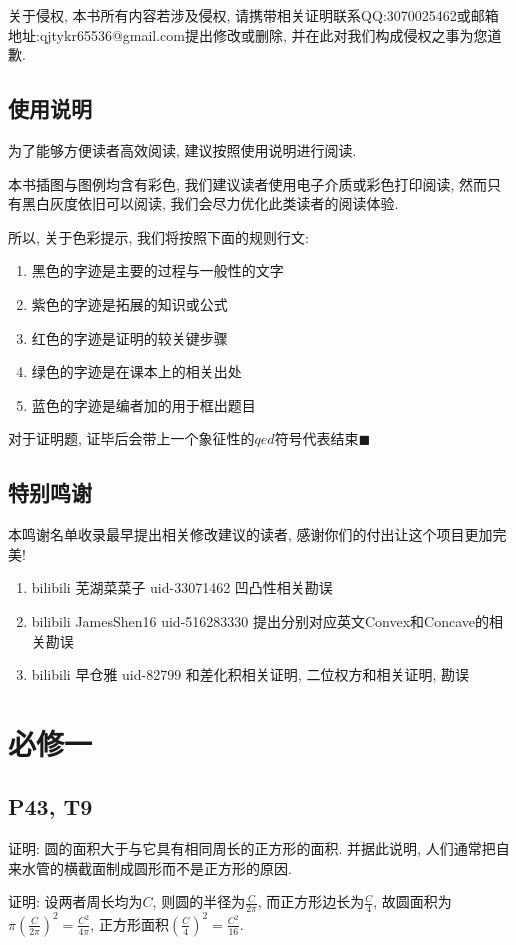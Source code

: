 \documentclass{book}
\begin{document}
关于侵权, 本书所有内容若涉及侵权, 请携带相关证明联系QQ:3070025462或邮箱地址:qjtykr65536@gmail.com提出修改或删除, 并在此对我们构成侵权之事为您道歉.
\section{使用说明}

为了能够方便读者高效阅读, 建议按照使用说明进行阅读.

本书插图与图例均含有彩色, 我们建议读者使用电子介质或彩色打印阅读, 然而只有黑白灰度依旧可以阅读, 我们会尽力优化此类读者的阅读体验.

所以, 关于色彩提示, 我们将按照下面的规则行文:

\begin{enumerate}
    \item 黑色的字迹是主要的过程与一般性的文字
    \item \textcolor[rgb]{0.38,0.11,0.2}{紫色的字迹是拓展的知识或公式}
    \item \textcolor[rgb]{0.75,0.17,0.22}{红色的字迹是证明的较关键步骤}
    \item \textcolor[rgb]{0.11,0.65,0.52}{绿色的字迹是在课本上的相关出处}
    \item \textcolor[rgb]{0.13,0.47,0.72}{蓝色的字迹是编者加的用于框出题目}
\end{enumerate}

对于证明题, 证毕后会带上一个象征性的$qed$符号代表结束$\blacksquare$

\section{特别鸣谢}
本鸣谢名单收录最早提出相关修改建议的读者, 感谢你们的付出让这个项目更加完美!
\begin{enumerate}
    \item bilibili 芜湖菜菜子 uid-33071462 凹凸性相关勘误
    \item bilibili JamesShen16 uid-516283330 提出分别对应英文Convex和Concave的相关勘误
    \item bilibili 早仓雅 uid-82799 和差化积相关证明, 二位权方和相关证明, 勘误
\end{enumerate}
\chapter{必修一}
\section{\textcolor[rgb]{0.11,0.65,0.52}{P43, T9}}
\begin{boxB}
    证明: 圆的面积大于与它具有相同周长的正方形的面积. 并据此说明, 人们通常把自来水管的横截面制成圆形而不是正方形的原因.
\end{boxB}
\doublespacing
证明: 设两者周长均为$C$, 则圆的半径为$\displaystyle \frac{C}{2\pi}$, 而正方形边长为$\displaystyle \frac{C}{4}$, 故圆面积为$\displaystyle \pi(\frac{C}{2\pi})^2=\frac{C^2}{4\pi}$, 正方形面积$\displaystyle (\frac{C}{4})^2=\frac{C^2}{16}$.
\end{document}
